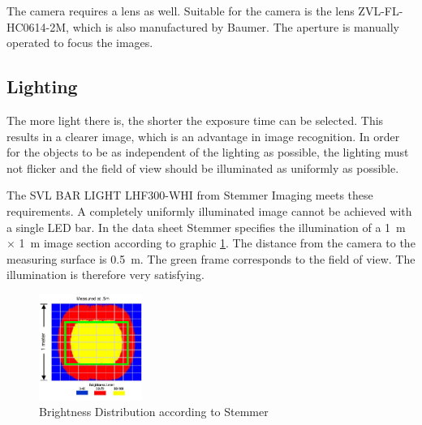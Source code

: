 The camera requires a lens as well.
Suitable for the camera is the lens ZVL-FL-HC0614-2M, which is also manufactured by Baumer.
The aperture is manually operated to focus the images.

\subsection{Lighting}
\label{subsec:Lighting}
The more light there is, the shorter the exposure time can be selected.
This results in a clearer image, which is an advantage in image recognition.
In order for the objects to be as independent of the lighting as possible, the lighting must not flicker and the field of view should be illuminated as uniformly as possible.

The SVL BAR LIGHT LHF300-WHI from Stemmer Imaging meets these requirements.
A completely uniformly illuminated image cannot be achieved with a single LED bar.
In the data sheet Stemmer specifies the illumination of a \SI{1}{m} $\times$ \SI{1}{m} image section according to graphic \ref{fig:lighting_LEDBAR}.
The distance from the camera to the measuring surface is \SI{0.5}{m}.
The green frame corresponds to the field of view.
The illumination is therefore very satisfying.

\begin{figure}[h]
	\centering
	\includegraphics[width=0.3\textwidth]{graphics/brightness_level.pdf}
	\caption{Brightness Distribution according to Stemmer \cite{stemmer_datasheet}}
	\label{fig:lighting_LEDBAR}
\end{figure}
